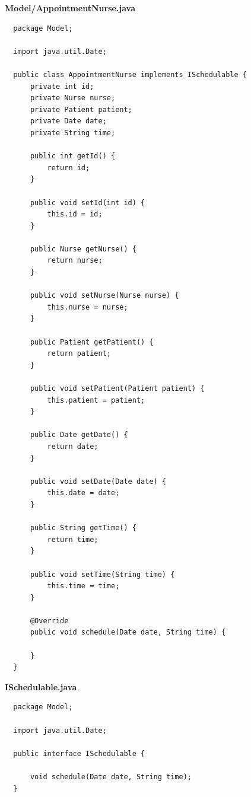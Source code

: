 \documentclass{article}
\begin{document}
\textbf{Model/AppointmentNurse.java}
\begin{verbatim}
  package Model;

  import java.util.Date;

  public class AppointmentNurse implements ISchedulable {
      private int id;
      private Nurse nurse;
      private Patient patient;
      private Date date;
      private String time;

      public int getId() {
          return id;
      }

      public void setId(int id) {
          this.id = id;
      }

      public Nurse getNurse() {
          return nurse;
      }

      public void setNurse(Nurse nurse) {
          this.nurse = nurse;
      }

      public Patient getPatient() {
          return patient;
      }

      public void setPatient(Patient patient) {
          this.patient = patient;
      }

      public Date getDate() {
          return date;
      }

      public void setDate(Date date) {
          this.date = date;
      }

      public String getTime() {
          return time;
      }

      public void setTime(String time) {
          this.time = time;
      }

      @Override
      public void schedule(Date date, String time) {

      }
  }
\end{verbatim}

\textbf{ISchedulable.java}
\begin{verbatim}
  package Model;

  import java.util.Date;

  public interface ISchedulable {

      void schedule(Date date, String time);
  }
\end{verbatim}
\end{document}
